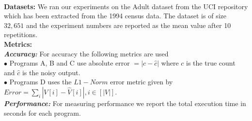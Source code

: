 \\\textbf{Datasets:}
We ran our experiments on the Adult dataset from the UCI repository \cite{UCI}  which has been extracted from the 1994 census data. The dataset is of size $32,651$ and the experiment numbers are reported as the mean value after 10 repetitions.
\\\textbf{Metrics:}
\\\textbf{\textit{Accuracy:}} For accuracy the following metrics are used
\\$\bullet$ Programs A, B and C use absolute error $ =|c-\hat{c}|$ where $c$ is the true count and $\hat{c}$ is the noisy output.\\ $\bullet$ Programs D uses the $L1-Norm$ error metric given  by $Error=\sum_{i}|V[i]-\hat{V}[i]|, i \in [|V|]$.\\
\textbf{\textit{Performance:}} For measuring performance we report the total execution time in seconds for each program.





